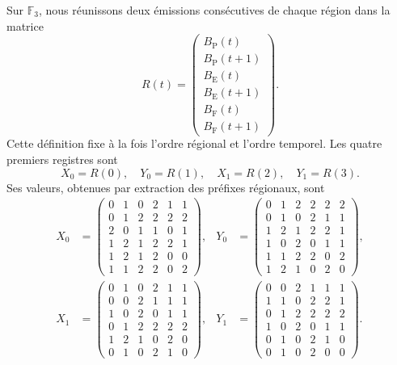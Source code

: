Sur \(\mathbb F_3\), nous réunissons deux émissions consécutives de chaque région dans la matrice
\begin{equation}
 R(t)=
 \begin{pmatrix}
 B_{\mathrm P}(t)\\ B_{\mathrm P}(t+1)\\
 B_{\mathrm E}(t)\\ B_{\mathrm E}(t+1)\\
 B_{\mathrm F}(t)\\ B_{\mathrm F}(t+1)
 \end{pmatrix}.
 \label{eq:df-registro-matricial}
\end{equation}
Cette définition fixe à la fois l'ordre régional et l'ordre temporel. Les
quatre premiers registres sont
\[
 X_0=R(0),\quad Y_0=R(1),\quad X_1=R(2),\quad Y_1=R(3).
\]
Ses valeurs, obtenues par extraction des préfixes régionaux, sont
\begin{align*}
 X_0&=\begin{pmatrix}
0&1&0&2&1&1\\0&1&2&2&2&2\\2&0&1&1&0&1\\
1&2&1&2&2&1\\1&2&1&2&0&0\\1&1&2&2&0&2
\end{pmatrix},&
 Y_0&=\begin{pmatrix}
0&1&2&2&2&2\\0&1&0&2&1&1\\1&2&1&2&2&1\\
1&0&2&0&1&1\\1&1&2&2&0&2\\1&2&1&0&2&0
\end{pmatrix},\\[1ex]
 X_1&=\begin{pmatrix}
0&1&0&2&1&1\\0&0&2&1&1&1\\1&0&2&0&1&1\\
0&1&2&2&2&2\\1&2&1&0&2&0\\0&1&0&2&1&0
\end{pmatrix},&
 Y_1&=\begin{pmatrix}
0&0&2&1&1&1\\1&1&0&2&2&1\\0&1&2&2&2&2\\
1&0&2&0&1&1\\0&1&0&2&1&0\\0&1&0&2&0&0
\end{pmatrix}.
\end{align*}

